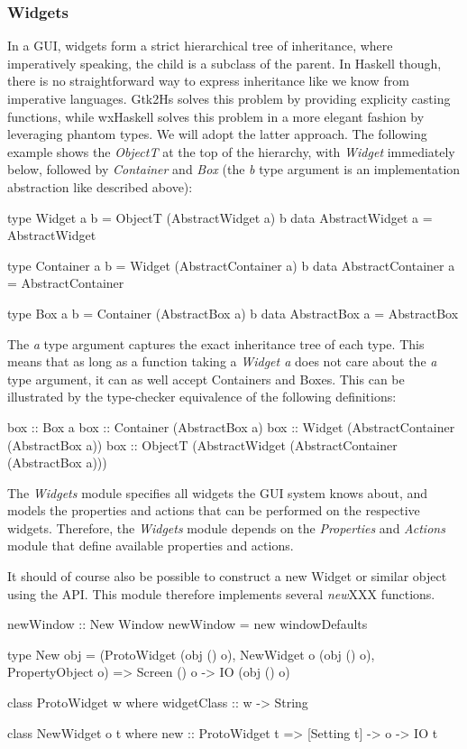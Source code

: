 \documentclass[11pt,a4paper]{article}
\begin{document}
\subsubsection{Widgets}
In a GUI, widgets form a strict hierarchical tree of inheritance, where imperatively speaking, the child is a subclass of the parent.
In Haskell though, there is no straightforward way to express inheritance like we know from imperative languages.
Gtk2Hs solves this problem by providing explicity casting functions, while wxHaskell solves this problem in a more elegant fashion by leveraging phantom types.
We will adopt the latter approach.
The following example shows the \textit{ObjectT} at the top of the hierarchy, with \textit{Widget} immediately below, followed by \textit{Container} and \textit{Box} (the \textit{b} type argument is an implementation abstraction like described above):
\begin{haskell}
type Widget a b = ObjectT (AbstractWidget a) b
data AbstractWidget a = AbstractWidget

type Container a b = Widget (AbstractContainer a) b
data AbstractContainer a = AbstractContainer

type Box a b = Container (AbstractBox a) b
data AbstractBox a = AbstractBox
\end{haskell}

The \textit{a} type argument captures the exact inheritance tree of each type.
This means that as long as a function taking a \textit{Widget a} does not care about the \textit{a} type argument, it can as well accept Containers and Boxes.
This can be illustrated by the type-checker equivalence of the following definitions:
\begin{haskell}
box :: Box a
box :: Container (AbstractBox a)
box :: Widget (AbstractContainer (AbstractBox a))
box :: ObjectT (AbstractWidget (AbstractContainer (AbstractBox a)))
\end{haskell}

The \textit{Widgets} module specifies all widgets the GUI system knows about, and models the properties and actions that can be performed on the respective widgets.
Therefore, the \textit{Widgets} module depends on the \textit{Properties} and \textit{Actions} module that define available properties and actions.

It should of course also be possible to construct a new Widget or similar object using the API.
This module therefore implements several \textit{new}XXX functions.
\begin{haskell}
newWindow :: New Window
newWindow = new windowDefaults

type New obj = (ProtoWidget (obj () o),
                NewWidget o (obj () o),
                PropertyObject o) =>
                  Screen () o -> IO (obj () o)

class ProtoWidget w where
  widgetClass :: w -> String

class NewWidget o t where
  new :: ProtoWidget t => [Setting t] -> o -> IO t
\end{haskell}
\end{document}
